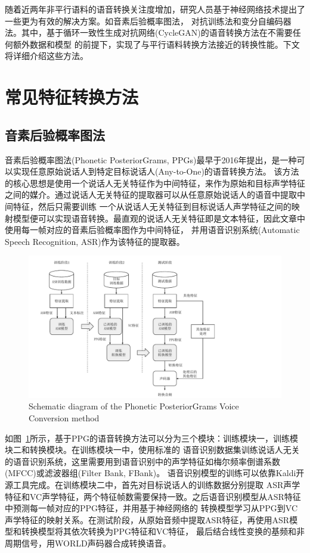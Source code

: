随着近两年非平行语料的语音转换关注度增加，研究人员基于神经网络技术提出了一些更为有效的解决方案。如音素后验概率图法，
对抗训练法和变分自编码器法。其中，基于循环一致性生成对抗网络(CycleGAN)的语音转换方法在不需要任何额外数据和模型
的前提下，实现了与平行语料转换方法接近的转换性能。下文将详细介绍这些方法。

\section{常见特征转换方法}
\subsection{音素后验概率图法}
音素后验概率图法(Phonetic PosteriorGrams, PPGs)最早于2016年提出，是一种可以实现任意原始说话人到特定目标说话人(Any-to-One)的语音转换方法\cite{sun2016phonetic}。
该方法的核心思想是使用一个说话人无关特征作为中间特征，来作为原始和目标声学特征之间的媒介。通过说话人无关特征的提取器可以从任意原始说话人的语音中提取中间特征，然后只需要训练
一个从说话人无关特征到目标说话人声学特征之间的映射模型便可以实现语音转换。最直观的说话人无关特征即是文本特征，因此文章中使用每一帧对应的音素后验概率图作为中间特征，
并用语音识别系统(Automatic Speech Recognition, ASR)作为该特征的提取器。

\begin{figure}[!htp]
    \centering
    \includegraphics[width=13cm,trim=10 0 160 0,clip]{figure/3_ppg.pdf}
    {Schematic diagram of the Phonetic PosteriorGrams Voice Conversion method}
    \label{fig:ppg}
\end{figure}

如图~\ref{fig:ppg}所示，基于PPG的语音转换方法可以分为三个模块：训练模块一，训练模块二和转换模块。在训练模块一中，使用标准的
语音识别数据集训练说话人无关的语音识别系统，这里需要用到语音识别中的声学特征如梅尔频率倒谱系数(MFCC)或滤波器组(Filter Bank, FBank)。
语音识别模型的训练可以依靠Kaldi开源工具\cite{povey2011kaldi}完成。在训练模块二中，首先对目标说话人的训练数据分别提取
ASR声学特征和VC声学特征，两个特征帧数需要保持一致。之后语音识别模型从ASR特征中预测每一帧对应的PPG特征，并用基于神经网络的
转换模型学习从PPG到VC声学特征的映射关系。在测试阶段，从原始音频中提取ASR特征，再使用ASR模型和转换模型将其依次转换为PPG特征和VC特征，
最后结合线性变换的基频和非周期信号，用WORLD声码器合成转换语音。

